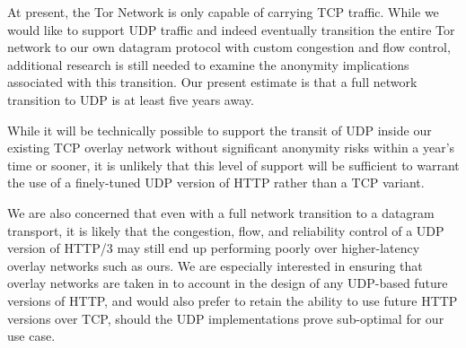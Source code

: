 \documentclass[letterpaper,11pt]{llncs}
\begin{document}
At present, the Tor Network is only capable of carrying TCP traffic. While we
would like to support UDP traffic and indeed eventually transition the entire
Tor network to our own datagram protocol with custom congestion and flow
control, additional research is still needed to examine the anonymity
implications associated with this transition. Our present estimate is that a
full network transition to UDP is at least five years away.


While it will be technically possible to support the transit of UDP inside our
existing TCP overlay network without significant anonymity risks within a
year's time or sooner, it is unlikely that this level of support will be
sufficient to warrant the use of a finely-tuned UDP version of HTTP rather
than a TCP variant.

We are also concerned that even with a full network transition to a datagram
transport, it is likely that the congestion, flow, and reliability control of
a UDP version of HTTP/3 may still end up performing poorly over higher-latency
overlay networks such as ours. We are especially interested in ensuring that
overlay networks are taken in to account in the design of any UDP-based future
versions of HTTP, and would also prefer to retain the ability to use future
HTTP versions over TCP, should the UDP implementations prove sub-optimal for
our use case.



 

\clearpage
\appendix
\end{document}
